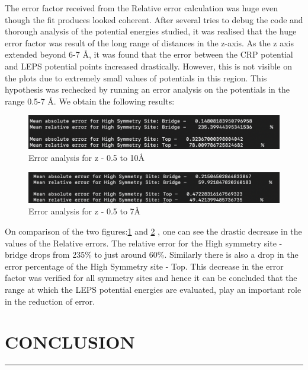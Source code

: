 \documentclass[12pt]{article}
\begin{document}
\vspace{5mm}
The error factor received from the Relative error calculation was huge even though the fit produces looked coherent. After several tries to debug the code and thorough analysis of the potential energies studied, it was realised that the huge error factor was result of the long range of distances in the z-axis. As the z axis extended beyond 6-7 \AA, it was found that the error between the CRP potential and LEPS potential points increased drastically. However, this is not visible on the plots due to extremely small values of potentials in this region. This hypothesis was rechecked by running an error analysis on the potentials in the range 0.5-7 \AA. We obtain the following results:
\begin{figure}[h!]
    \centering
    \includegraphics[width = \textwidth]{errorbefore.png}
      \caption{Error analysis for z - 0.5 to 10\AA} 
    \label{fig:38}
\end{figure}     
\begin{figure}[h!]
    \centering
    \includegraphics[width = \textwidth]{errorafter.png}
      \caption{Error analysis for z - 0.5 to 7\AA} 
    \label{fig:39}
\end{figure}     

On comparison of the two figures:\ref{fig:38} and \ref{fig:39} , one can see the drastic decrease in the values of the Relative errors. The relative error for the High symmetry site - bridge drops from 235\% to just around 60\%. Similarly there is also a drop in the error percentage of the High Symmetry site - Top. This decrease in the error factor was verified for all symmetry sites and hence it can be concluded that the range at which the LEPS potential energies are evaluated, play an important role in the reduction of error.

\section{CONCLUSION}
\par\noindent\rule{\textwidth}{0.4pt}
\end{document}
